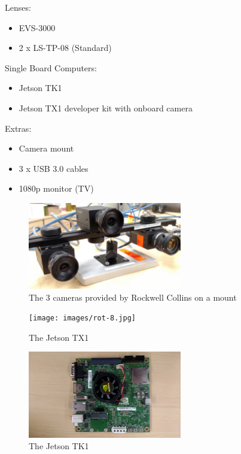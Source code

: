 \documentclass[letterpaper,10pt,titlepage]{IEEEtran}
\begin{document}
	Lenses: 
		\begin{itemize}
		\item EVS-3000 
		\item 2 x LS-TP-08 (Standard)\\
		\end{itemize}
	Single Board Computers: 
		\begin{itemize}
		\item Jetson TK1
		\item Jetson TX1 developer kit with onboard camera\\
		\end{itemize}
	Extras: 
		\begin{itemize}
		\item Camera mount
		\item 3 x USB 3.0 cables
		\item 1080p monitor (TV)\\
		\end{itemize}
\begin{figure}[!ht]
  \caption{The 3 cameras provided by Rockwell Collins on a mount}
	  \centering
		    \includegraphics[width=0.6\textwidth,natwidth=610,natheight=642]{images/IMG_20160210_131527329.jpg}
				\end{figure}
\begin{figure}[!ht]
  \caption{The Jetson TX1}
	  \centering
		    \texttt{[image: images/rot-8.jpg]}
				\end{figure}
\begin{figure}[!ht]
  \caption{The Jetson TK1}
	  \centering
		    \includegraphics[width=0.6\textwidth,natwidth=610,natheight=642]{images/rot-9.jpg}
				\end{figure}
\end{document}

